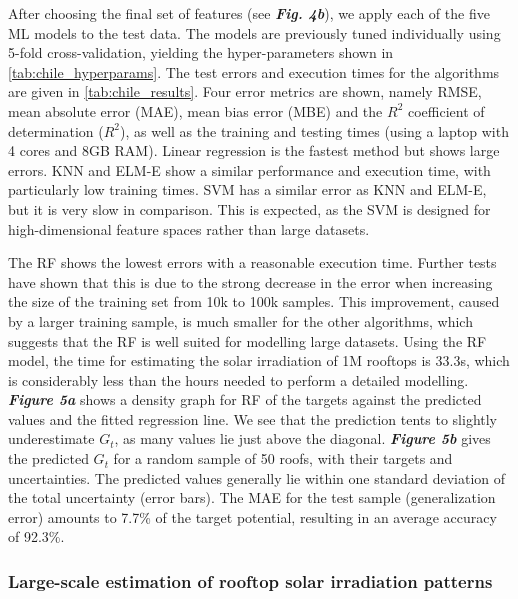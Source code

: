 After choosing the final set of features (see \textbf{\textit{Fig. 4b}}), we apply each of the five ML models to the test data. The models are previously tuned individually using 5-fold cross-validation, yielding the hyper-parameters shown in \ref{tab:chile_hyperparams}. The test errors and execution times for the algorithms are given in \ref{tab:chile_results}. Four error metrics are shown, namely RMSE, mean absolute error (MAE), mean bias error (MBE) and the $R^2$ coefficient of determination ($R^2$), as well as the training and testing times (using a laptop with 4 cores and 8GB RAM). Linear regression is the fastest method but shows large errors. KNN and ELM-E show a similar performance and execution time, with particularly low training times. SVM has a similar error as KNN and ELM-E, but it is very slow in comparison. This is expected, as the SVM is designed for high-dimensional feature spaces rather than large datasets. 

The RF shows the lowest errors with a reasonable execution time. Further tests have shown that this is due to the strong decrease in the error when increasing the size of the training set from 10k to 100k samples. This improvement, caused by a larger training sample, is much smaller for the other algorithms, which suggests that the RF is well suited for modelling large datasets. Using the RF model, the time for estimating the solar irradiation of 1M rooftops is 33.3s, which is considerably less than the hours needed to perform a detailed modelling. \textbf{\textit{Figure 5a}} shows a density graph for RF of the targets against the predicted values and the fitted regression line. We see that the prediction tents to slightly underestimate $G_t$, as many values lie just above the diagonal. \textbf{\textit{Figure 5b}} gives the predicted $G_t$ for a random sample of 50 roofs, with their targets and uncertainties. The predicted values generally lie within one standard deviation of the total uncertainty (error bars). The MAE for the test sample (generalization error) amounts to 7.7\% of the target potential, resulting in an average accuracy of 92.3\%. 

\subsubsection{Large-scale estimation of rooftop solar irradiation patterns}

